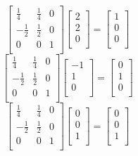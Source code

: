 \documentclass{article}
\begin{document}
\begin{equation}
 \left[
 \begin{array}{ccc}
   \frac{1}{4}&\frac{1}{4}&0\\
   -\frac{1}{2}&\frac{1}{2}&0\\
   0&0&1\\
 \end{array}\right]
 \left[
 \begin{array}{c}
   2\\
   2\\
   0\\
 \end{array}\right]
 =\left[
 \begin{array}{c}
   1\\
   0\\
   0\\
 \end{array}\right]
\end{equation}
\begin{equation}
 \left[
 \begin{array}{ccc}
   \frac{1}{4}&\frac{1}{4}&0\\
   -\frac{1}{2}&\frac{1}{2}&0\\
   0&0&1\\
 \end{array}\right]
 \left[
 \begin{array}{c}
   -1\\
   1\\
   0\\
 \end{array}\right]
 =\left[
 \begin{array}{c}
   0\\
   1\\
   0\\
 \end{array}\right]
\end{equation}
\begin{equation}
 \left[
 \begin{array}{ccc}
   \frac{1}{4}&\frac{1}{4}&0\\
   -\frac{1}{2}&\frac{1}{2}&0\\
   0&0&1\\
 \end{array}\right]
 \left[
 \begin{array}{c}
   0\\
   0\\
   1\\
 \end{array}\right]
 =\left[
 \begin{array}{c}
   0\\
   0\\
   1\\
 \end{array}\right]
\end{equation}
\end{document}
